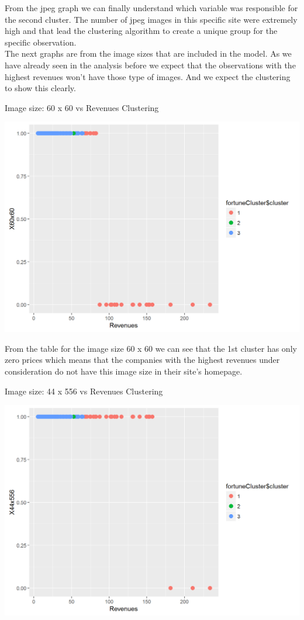 \documentclass{article}
\begin{document}
From the jpeg graph we can finally understand which variable was responsible for the second cluster. The number of jpeg images in this specific site were extremely high and that lead the clustering algorithm to create a unique group for the specific observation.\\
The next graphs are from the image sizes that are included in the model. As we have already seen in the analysis before we expect that the observations with the highest revenues won't have those type of images. And we expect the clustering to show this clearly.
\begin{table}[H]
\centering
\caption{Image size: 60 x 60 vs Revenues Clustering}
\begin{center}
\includegraphics[scale=0.4]{../R/photos/96_clust_60.png}   \\
\end{center}
\end{table}
From the table for the image size 60 x 60 we can see that the 1st cluster has only zero prices which means that the companies with the highest revenues under consideration do not have this image size in their site's homepage.
\begin{table}[H]
\centering
\caption{Image size: 44 x 556 vs Revenues Clustering}
\begin{center}
\includegraphics[scale=0.4]{../R/photos/97_clust_44.png}   \\
\end{center}
\end{table}
\end{document}
